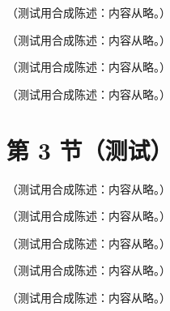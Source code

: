 \begin{lemma}[程函恒等式]\label{lem:prelim-eikonal-identity}
（测试用合成陈述：内容从略。）
\end{lemma}

\begin{example}[$m=2$ 的程函恒等式与入射夸克传播子的程函极限]\label{ex:prelim-eikonal-two}
（测试用合成陈述：内容从略。）
\end{example}

\begin{example}[有限类光线段的单胶子项]\label{ex:prelim-wilson-segment}
（测试用合成陈述：内容从略。）
\end{example}

\begin{definition}[维数正规化的技术约定]\label{def:prelim-dr-conventions}
（测试用合成陈述：内容从略。）
\end{definition}

\section{第 3 节（测试）}\label{sec:prelim-dimreg}

\begin{lemma}[无标度积分为零]\label{lem:prelim-scaleless}
（测试用合成陈述：内容从略。）
\end{lemma}

\begin{example}\label{ex:prelim-scaleless}
（测试用合成陈述：内容从略。）
\end{example}

\begin{definition}\label{def:prelim-gamma5}
（测试用合成陈述：内容从略。）
\end{definition}

\begin{definition}[加号分布]\label{def:prelim-plus}
（测试用合成陈述：内容从略。）
\end{definition}

\begin{lemma}\label{lem:prelim-plus-expansion}
（测试用合成陈述：内容从略。）
\end{lemma}

